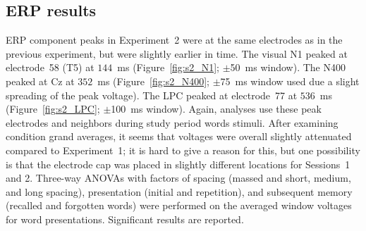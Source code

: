 \subsection{ERP results}

ERP component peaks in Experiment~2 were at the same electrodes as in the previous experiment, but were slightly earlier in time.
The visual N1 peaked at electrode~58 (T5) at $144$~ms (Figure~\ref{fig:s2_N1}; $\pm$50~ms window).  The N400 peaked at Cz at $352$~ms (Figure~\ref{fig:s2_N400}; $\pm$75~ms window used due a slight spreading of the peak voltage).  The LPC peaked at electrode~77 at $536$~ms (Figure~\ref{fig:s2_LPC}; $\pm$100~ms window).  Again, analyses use these peak electrodes and neighbors during study period words stimuli.  After examining condition grand averages, it seems that voltages were overall slightly attenuated compared to Experiment~1; it is hard to give a reason for this, but one possibility is that the electrode cap was placed in slightly different locations for Sessions~1 and 2.
Three-way ANOVAs with factors of spacing (massed and short, medium, and long spacing), presentation (initial and repetition), and subsequent memory (recalled and forgotten words) were performed on the averaged window voltages for word presentations.  Significant results are reported.


